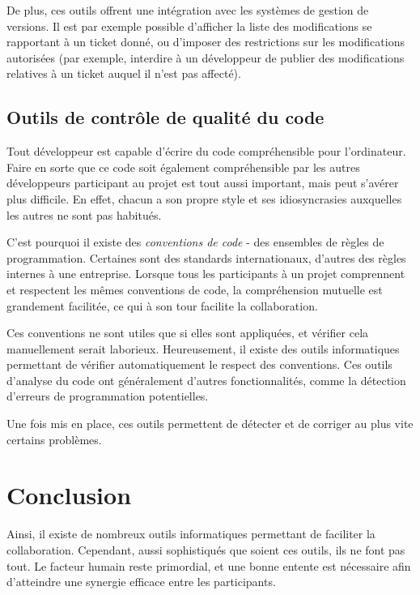 De plus, ces outils offrent une intégration avec les systèmes de gestion de versions. Il est par exemple possible d’afficher la liste des modifications se rapportant à un ticket donné, ou d’imposer des restrictions sur les modifications autorisées (par exemple, interdire à un développeur de publier des modifications relatives à un ticket auquel il n’est pas affecté).

\subsection{Outils de contrôle de qualité du code}

Tout développeur est capable d’écrire du code compréhensible pour l’ordinateur. Faire en sorte que ce code soit également compréhensible par les autres développeurs participant au projet est tout aussi important, mais peut s’avérer plus difficile. En effet, chacun a son propre style et ses idiosyncrasies auxquelles les autres ne sont pas habitués.

C’est pourquoi il existe des \textit{conventions de code} - des ensembles de règles de programmation. Certaines sont des standards internationaux, d’autres des règles internes à une entreprise. Lorsque tous les participants à un projet comprennent et respectent les mêmes conventions de code, la compréhension mutuelle est grandement facilitée, ce qui à son tour facilite la collaboration.

Ces conventions ne sont utiles que si elles sont appliquées, et vérifier cela manuellement serait laborieux. Heureusement, il existe des outils informatiques permettant de vérifier automatiquement le respect des conventions. Ces outils d’analyse du code ont généralement d’autres fonctionnalités, comme la détection d’erreurs de programmation potentielles.

Une fois mis en place, ces outils permettent de détecter et de corriger au plus vite certains problèmes.

\section{Conclusion}

Ainsi, il existe de nombreux outils informatiques permettant de faciliter la collaboration. Cependant, aussi sophistiqués que soient ces outils, ils ne font pas tout. Le facteur humain reste primordial, et une bonne entente est nécessaire afin d’atteindre une synergie efficace entre les participants.
